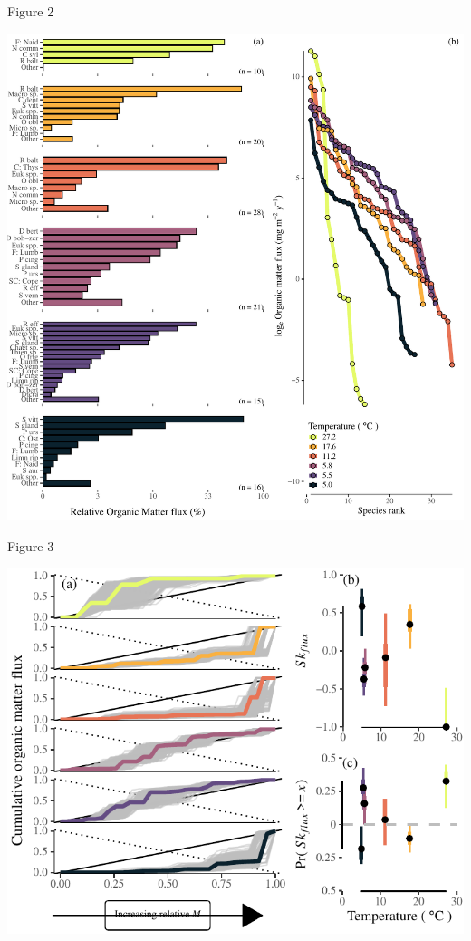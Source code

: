 \documentclass[
]{article}
\numberwithin{equation}
\begin{document}
\newpage

Figure 2

\includegraphics{Junker_temp-energy-flux_accepted_files/figure-latex/figure 2-1.pdf}

\newpage

Figure 3

\includegraphics{Junker_temp-energy-flux_accepted_files/figure-latex/figure 3-1.pdf}
\end{document}

